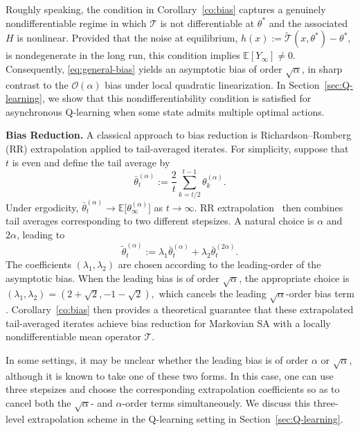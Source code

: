 \documentclass[11pt,letterpaper]{article}
\theoremstyle{plain}
\theoremstyle{definition}
\theoremstyle{remark}
\newcommand{\E}{\mathbb{E}}
\newcommand{\mT}{\mathcal{T}}
\newcommand{\tmT}{\widetilde{\mT}}
\begin{document}
Roughly speaking, the condition in Corollary~\ref{co:bias} captures a
genuinely nondifferentiable regime in which \(\mT\) is not differentiable at
\(\theta^*\) and the associated \(H\) is nonlinear. Provided
that the noise at equilibrium, $h(x):=\tmT(x,\theta^*)-\theta^*,$ is nondegenerate in the long run, this condition implies
\(\E[Y_\infty]\neq0\). Consequently, \eqref{eq:general-bias} yields an asymptotic bias of order \(\sqrt{\alpha}\), in sharp contrast to the
\(\mathcal O(\alpha)\) bias under local quadratic linearization. In
Section~\ref{sec:Q-learning}, we show that this nondifferentiability condition
is satisfied for asynchronous Q-learning when some state admits multiple
optimal actions.

\noindent\textbf{Bias Reduction.} A classical approach to bias reduction is Richardson--Romberg (RR)
extrapolation applied to tail-averaged iterates. For simplicity, suppose that
\(t\) is even and define the tail average by
\[
    \bar{\theta}_t^{(\alpha)}
    :=
    \frac{2}{t}
    \sum_{k=t/2}^{t-1}\theta_k^{(\alpha)}.
\]
Under ergodicity, $\bar{\theta}_t^{(\alpha)}
    \to\E\bigl[\theta_\infty^{(\alpha)}\bigr]$ as $t\to\infty.$
RR extrapolation~\cite{hildebrand1987introduction} then combines tail averages
corresponding to two different stepsizes. A natural choice is \(\alpha\) and
\(2\alpha\), leading to
\[
    \widetilde{\theta}_t^{(\alpha)}
    :=
    \lambda_1\bar{\theta}_t^{(\alpha)}
    +
    \lambda_2\bar{\theta}_t^{(2\alpha)}.
\]
The coefficients \((\lambda_1,\lambda_2)\) are chosen according to the
leading-order of the asymptotic bias. When the leading bias is of
order \(\sqrt{\alpha}\), the appropriate choice is $(\lambda_1,\lambda_2)
    =
    (2+\sqrt{2},-1-\sqrt{2}),$ which cancels the leading \(\sqrt{\alpha}\)-order bias term
\cite{zhang2024prelimit}. Corollary~\ref{co:bias} then provides a theoretical
guarantee that these extrapolated tail-averaged iterates achieve bias
reduction for Markovian SA with a locally
nondifferentiable mean operator \(\mT\).

In some settings, it may be unclear whether the leading 
bias is of order \(\alpha\) or \(\sqrt{\alpha}\), although it is known to take
one of these two forms. In this case, one can use three stepsizes and choose
the corresponding extrapolation coefficients so as to cancel both the
\(\sqrt{\alpha}\)- and \(\alpha\)-order terms simultaneously. We discuss this
three-level extrapolation scheme in the Q-learning setting in
Section~\ref{sec:Q-learning}.
\end{document}
